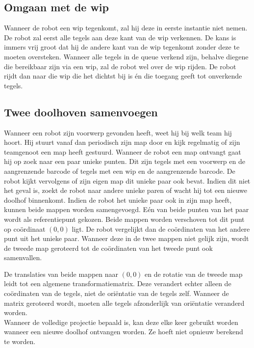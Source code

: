 \documentclass[tt3]{penoverslag}
\begin{document}
\subsection{Omgaan met de wip}
\label{ssec:AlgoWip}
Wanneer de robot een wip tegenkomt, zal hij deze in eerste instantie niet nemen. De robot zal eerst alle tegels aan deze kant van de wip verkennen. De kans is immers vrij groot dat hij de andere kant van de wip tegenkomt zonder deze te moeten oversteken. Wanneer alle tegels in de queue verkend zijn, behalve diegene die bereikbaar zijn via een wip, zal de robot wel over de wip rijden. De robot rijdt dan naar die wip die het dichtst bij is \'en die toegang geeft tot onverkende tegels.

\subsection{Twee doolhoven samenvoegen}
\label{ssec:AlgoMappen}
Wanneer een robot zijn voorwerp gevonden heeft, weet hij bij welk team hij hoort. Hij stuurt vanaf dan periodisch zijn map door en kijk regelmatig of zijn teamgenoot een map heeft gestuurd.
Wanneer de robot een map ontvangt gaat hij op zoek naar een paar unieke punten. Dit zijn tegels met een voorwerp en de aangrenzende barcode of tegels met een wip en de aangrenzende barcode. De robot kijkt vervolgens of zijn eigen map dit unieke paar ook bevat. Indien dit niet het geval is, zoekt de robot naar andere unieke paren of wacht hij tot een nieuwe doolhof binnenkomt.
Indien de robot het unieke paar ook in zijn map heeft, kunnen beide mappen worden samengevoegd. E\'en van beide punten van het paar wordt als referentiepunt gekozen. Beide mappen worden verschoven tot dit punt op co\"ordinaat $(0,0)$ ligt. De robot vergelijkt dan de co\"ordinaten van het andere punt uit het unieke paar. Wanneer deze in de twee mappen niet gelijk zijn, wordt de tweede map geroteerd tot de co\"ordinaten van het tweede punt ook samenvallen.

De translaties van beide mappen naar $(0,0)$ en de rotatie van de tweede map leidt tot een algemene transformatiematrix. Deze verandert echter alleen de co\"ordinaten van de tegels, niet de ori\"entatie van de tegels zelf. Wanneer de matrix geroteerd wordt, moeten alle tegels afzonderlijk van ori\"entatie veranderd worden.\\

Wanneer de volledige projectie bepaald is, kan deze elke keer gebruikt worden wanneer een nieuwe doolhof ontvangen worden. Ze hoeft niet opnieuw berekend te worden.
\end{document}
